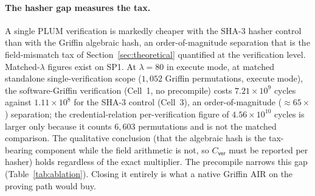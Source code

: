 \paragraph{The hasher gap measures the tax.}
A single PLUM verification is markedly cheaper with the SHA-3 hasher control than with the Griffin algebraic hash, an order-of-magnitude separation that is the field-mismatch tax of Section~\ref{sec:theoretical} quantified at the verification level. Matched-$\lambda$ figures exist on SP1. At $\lambda=80$ in execute mode, at matched standalone single-verification scope ($1{,}052$ Griffin permutations, execute mode), the software-Griffin verification (Cell~1, no precompile) costs $7.21\times10^{9}$ cycles against $1.11\times10^{8}$ for the SHA-3 control (Cell~3), an order-of-magnitude (${\approx}65\times$) separation; the credential-relation per-verification figure of $4.56\times10^{10}$ cycles is larger only because it counts $6{,}603$ permutations and is not the matched comparison. The qualitative conclusion (that the algebraic hash is the tax-bearing component while the field arithmetic is not, so $C_{\mathsf{ver}}$ must be reported per hasher) holds regardless of the exact multiplier. The precompile narrows this gap (Table~\ref{tab:ablation}). Closing it entirely is what a native Griffin AIR on the proving path would buy.

